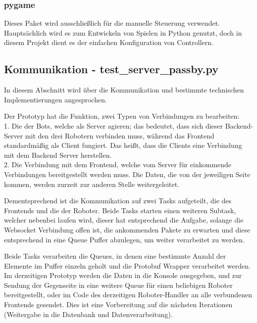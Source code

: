 \subsubsection{pygame}
Dieses Paket wird ausschließlich für die manuelle Steuerung verwendet.
Hauptsächlich wird es zum Entwickeln von Spielen in Python genutzt,
doch in diesem Projekt dient es der einfachen Konfiguration von Controllern.

\subsection{Kommunikation - test\_server\_passby.py}
In diesem Abschnitt wird über die Kommunikation 
und bestimmte technischen Implementierungen angesprochen.

Der Prototyp hat die Funktion, zwei Typen von Verbindungen zu bearbeiten: \\
%
1. Die der Bots, welche als Server agieren; 
das bedeutet, 
dass sich dieser Backend-Server mit den drei Robotern verbinden muss, 
während das Frontend standardmäßig als Client fungiert. 
Das heißt, dass die Clients eine Verbindung mit dem Backend Server herstellen. \\
% 
2. Die Verbindung mit dem Frontend, 
welche vom Server für einkommende Verbindungen bereitgestellt werden muss.
% 
Die Daten, die von der jeweiligen Seite kommen, 
werden zurzeit zur anderen Stelle weitergeleitet.

Dementsprechend ist die Kommunikation auf zwei Tasks aufgeteilt,
die des Frontends und die der Roboter.
% 
Beide Tasks starten einen weiteren Subtask, welcher nebenbei laufen wird, 
dieser hat entsprechend die Aufgabe, 
solange die Websocket Verbindung offen ist,
die ankommenden Pakete zu erwarten 
und diese entsprechend in eine Queue Puffer abzulegen, 
um weiter verarbeitet zu werden. 

Beide Tasks verarbeiten die Queues, 
in denen eine bestimmte Anzahl der Elemente im Puffer 
einzeln geholt und die Protobuf Wrapper verarbeitet werden.
% 
Im derzeitigen Prototyp werden die Daten in die Konsole ausgegeben,
und zur Sendung der Gegenseite in eine weitere Queue 
für einen beliebigen Roboter bereitgestellt, 
oder im Code des derzeitigen Roboter-Handler 
an alle verbundenen Frontends gesendet.
% 
Dies ist eine Vorbereitung auf die nächsten Iterationen 
(Weitergabe in die Datenbank und Datenverarbeitung).


